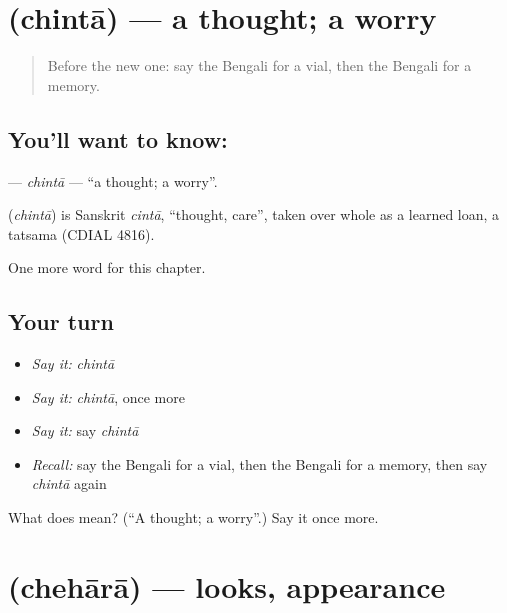\section[\texorpdfstring{\bn{চিন্তা} (chintā)}{চিন্তা (chintā)}]{ (chintā) — a thought; a worry}

\label{lesson:BN-C234-chinta}



\begin{quote}
Before the new one: say the Bengali for a vial, then the Bengali for a memory.
\end{quote}

\subsection*{You'll want to know: }
\textbf{} — \emph{chintā} — \textquotedblleft{}a thought; a worry\textquotedblright{}.

\begin{cousinweb}
\textbf{} (\emph{chintā}) is Sanskrit \emph{cintā}, \textquotedblleft{}thought, care\textquotedblright{}, taken over whole as a learned loan, a tatsama (CDIAL 4816).
\end{cousinweb}

\begin{grammarlens}[title={What you've built}]
One more word for this chapter.
\end{grammarlens}

\subsection*{Your turn}
\begin{itemize}
\raggedright
  \item \emph{Say it:} \emph{chintā}
  \item \emph{Say it:} \emph{chintā}, once more
  \item \emph{Say it:} say \emph{chintā}
  \item \emph{Recall:} say the Bengali for a vial, then the Bengali for a memory, then say \emph{chintā} again
\end{itemize}

\begin{tcolorbox}[breakable,colback=teal!4,colframe=teal!35!black,title={Before you move on}]
What does  mean? (\textquotedblleft{}A thought; a worry\textquotedblright{}.) Say it once more.
\end{tcolorbox}
\section[\texorpdfstring{\bn{চেহারা} (chehārā)}{চেহারা (chehārā)}]{ (chehārā) — looks, appearance}

